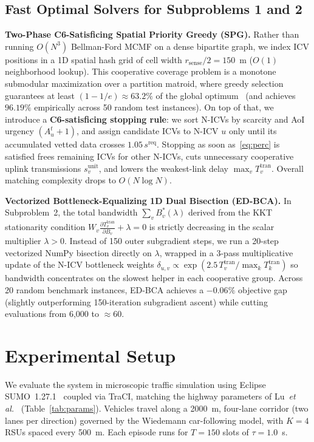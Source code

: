 \documentclass[conference]{IEEEtran}
\begin{document}
\subsection{Fast Optimal Solvers for Subproblems 1 and 2}
\textbf{Two-Phase C6-Satisficing Spatial Priority Greedy (SPG).} Rather than running $O(N^3)$ Bellman-Ford MCMF on a dense bipartite graph, we index ICV positions in a 1D spatial hash grid of cell width $r_{\mathrm{sense}}/2 = 150$~m ($O(1)$ neighborhood lookup). This cooperative coverage problem is a monotone submodular maximization over a partition matroid, where greedy selection guarantees at least $(1 - 1/e)\approx 63.2\%$ of the global optimum~\cite{nemhauser1978} (and achieves $96.19\%$ empirically across 50 random test instances). On top of that, we introduce a \textbf{C6-satisficing stopping rule}: we sort N-ICVs by scarcity and AoI urgency $(A^t_u+1)$, and assign candidate ICVs to N-ICV $u$ only until its accumulated vetted data crosses $1.05\,s^{\mathrm{req}}$. Stopping as soon as~\eqref{eq:perc} is satisfied frees remaining ICVs for other N-ICVs, cuts unnecessary cooperative uplink transmissions $s^{\mathrm{unit}}_v$, and lowers the weakest-link delay $\max_{v} T^{\mathrm{tran}}_v$. Overall matching complexity drops to $O(N\log N)$.

\textbf{Vectorized Bottleneck-Equalizing 1D Dual Bisection (ED-BCA).} In Subproblem~2, the total bandwidth $\sum_v B^*_v(\lambda)$ derived from the KKT stationarity condition $W_v \frac{\partial T^{\mathrm{tran}}_v}{\partial B_v} + \lambda = 0$ is strictly decreasing in the scalar multiplier $\lambda > 0$. Instead of 150 outer subgradient steps, we run a 20-step vectorized NumPy bisection directly on $\lambda$, wrapped in a 3-pass multiplicative update of the N-ICV bottleneck weights $\delta_{u,v}\propto \exp(2.5\, T^{\mathrm{tran}}_v / \max_{k} T^{\mathrm{tran}}_k)$ so bandwidth concentrates on the slowest helper in each cooperative group. Across 20 random benchmark instances, ED-BCA achieves a $-0.06\%$ objective gap (slightly outperforming 150-iteration subgradient ascent) while cutting evaluations from 6,000 to $\approx 60$.

\section{Experimental Setup}
We evaluate the system in microscopic traffic simulation using Eclipse SUMO~1.27.1~\cite{sumo} coupled via TraCI, matching the highway parameters of Lu~\textit{et al.}~\cite{lu2025} (Table~\ref{tab:params}). Vehicles travel along a 2000~m, four-lane corridor (two lanes per direction) governed by the Wiedemann car-following model, with $K=4$ RSUs spaced every 500~m. Each episode runs for $T=150$ slots of $\tau=1.0$~s.
\end{document}

